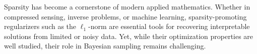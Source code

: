 \documentclass[11pt, twoside]{report}
\begin{document}

Sparsity has become a cornerstone of modern applied mathematics. Whether in compressed sensing, inverse problems, or machine learning, sparsity-promoting regularizers such as the $\ell_1$-norm are essential tools for recovering interpretable solutions from limited or noisy data. Yet, while their optimization properties are well studied, their role in Bayesian sampling remains challenging.
\end{document}

